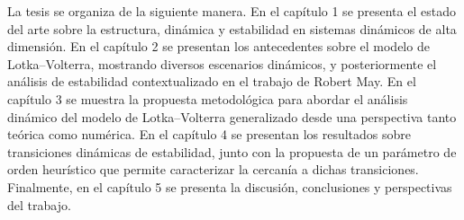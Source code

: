 La tesis se organiza de la siguiente manera. En el capítulo 1 se presenta el estado del arte sobre la estructura, dinámica y estabilidad en sistemas dinámicos de alta dimensión. En el capítulo 2 se presentan los antecedentes sobre el modelo de Lotka--Volterra, mostrando diversos escenarios dinámicos, y posteriormente el análisis de estabilidad contextualizado en el trabajo de Robert May. En el capítulo 3 se muestra la propuesta metodológica para abordar el análisis dinámico del modelo de Lotka–Volterra generalizado desde una perspectiva tanto teórica como numérica. En el capítulo 4 se presentan los resultados sobre transiciones dinámicas de estabilidad, junto con la propuesta de un parámetro de orden heurístico que permite caracterizar la cercanía a dichas transiciones. Finalmente, en el capítulo 5 se presenta la discusión, conclusiones y perspectivas del trabajo.



